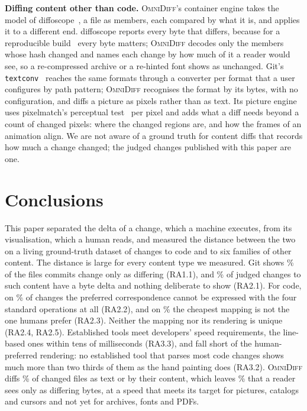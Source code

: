 \documentclass[sigconf,review]{acmart}
\begin{document}
\textbf{Diffing content other than code.} \textsc{OmniDiff}'s container engine takes the model of
diffoscope~\cite{diffoscope}, a file as members, each compared by what it is, and applies it to a
different end. diffoscope reports every byte that differs, because for a reproducible
build~\cite{lamb-reproducible-2022} every byte matters; \textsc{OmniDiff} decodes only the members
whose hash changed and names each change by how much of it a reader would see, so a re-compressed
archive or a re-hinted font shows as unchanged. Git's \texttt{textconv}~\cite{gitattributes}
reaches the same formats through a converter per format that a user configures by path pattern;
\textsc{OmniDiff} recognises the format by its bytes, with no configuration, and diffs a picture
as pixels rather than as text. Its picture engine uses pixelmatch's perceptual
test~\cite{pixelmatch} per pixel and adds what a diff needs beyond a count of changed pixels:
where the changed regions are, and how the frames of an animation align. We are not aware of a
ground truth for content diffs that records how much a change changed; the judged changes
published with this paper are one.

\section{Conclusions}
\label{sec:conclusion}

This paper separated the delta of a change, which a machine executes, from its visualisation,
which a human reads, and measured the distance between the two on a living ground-truth dataset
of changes to code and to six families of other content. The distance is large for every content
type we measured. Git shows \ChangeCensusBinaryPct{}\% of the files commits change only as
differing (RA1.1), and \ContentVerdictNothingPct{}\% of judged changes to such content have a
byte delta and nothing deliberate to show (RA2.1). For code, on
\AmbiguityListPct{}\% of changes the preferred correspondence cannot be expressed with the four
standard operations at all (RA2.2), and on \CostHumanHigherPct{}\% the cheapest mapping is not
the one humans prefer (RA2.3). Neither the mapping nor its rendering is unique (RA2.4, RA2.5).
Established tools meet developers' speed requirements, the line-based ones within tens of
milliseconds (RA3.3), and fall short of the human-preferred rendering: no established tool that
parses most code changes shows much more than two thirds of them as the hand painting does
(RA3.2).
\textsc{OmniDiff} diffs \ContentCensusShownPct{}\% of changed files as text or by their content,
which leaves \ContentCensusLeftPct{}\% that a reader sees only as differing bytes, at a speed
that meets its target for pictures, catalogs and cursors and not yet for archives, fonts and
PDFs.
\end{document}
